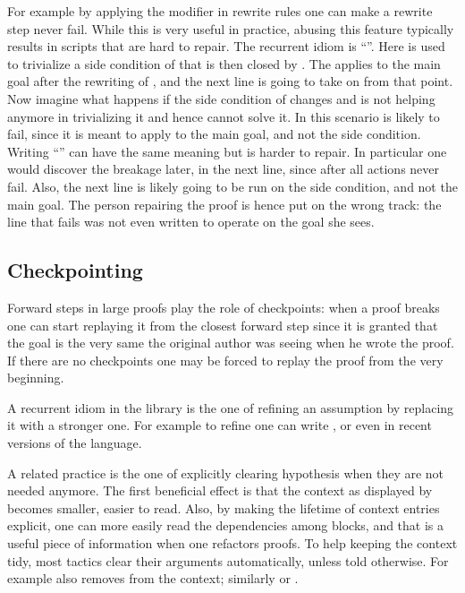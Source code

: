 For example by applying the 
modifier in rewrite rules one can make a rewrite step never fail.
While this is very useful in practice,
abusing this feature typically results in scripts that are hard to
repair. The recurrent idiom is ``''.
Here  is used to trivialize a side condition of  that
is then closed by \C{//}. The  applies to the main goal
after the rewriting of , and the next line is going to take
on from that point.
Now imagine what happens if the side condition of  changes and
 is not helping anymore in trivializing it and hence
\C{//} cannot solve it. In this scenario  is likely to fail,
since it is meant to apply to the main goal, and not the side
condition.\\
Writing ``'' can have the same meaning but
is harder to repair. In particular one would discover the breakage
later, in the next line, since after  all actions never fail.
Also, the next line is likely going to be run on the side
condition, and not the main goal. The person repairing the proof is
hence put on the wrong track: the line that fails was not even
written to operate on the goal she sees.

\subsection{Checkpointing}

Forward steps in large proofs play the role of checkpoints:
when a proof breaks one can start replaying it from the closest
forward step since it is granted that the goal is the very same
the original author was seeing when he wrote the proof. If there are
no checkpoints one may be forced to replay the proof from the very
beginning.

A recurrent idiom in the \mcbMC{} library is the one of refining an
assumption by replacing it with a stronger one. For example to refine
 one can write , or even  in recent versions of the \mcbSSR{} language.

A related practice is the one of explicitly clearing hypothesis when
they are not needed anymore. The first beneficial effect is that the
context as displayed by \Coq{} becomes smaller, easier to read.  Also,
by making the lifetime of context entries explicit, one can more
easily read the dependencies among blocks, and that is a useful piece
of information when one refactors proofs.  To help keeping the context
tidy, most tactics clear their arguments automatically, unless told
otherwise. For example  also removes  from the
context; similarly  or .

